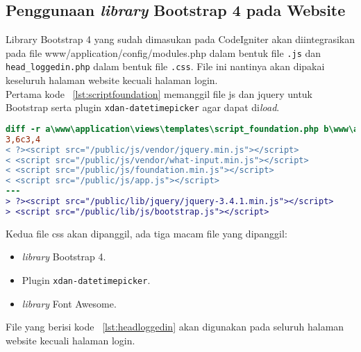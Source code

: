\subsection{Penggunaan \textit{library} Bootstrap 4 pada Website}

Library Bootstrap 4 yang sudah dimasukan pada CodeIgniter akan diintegrasikan pada file www/application/config/modules.php dalam bentuk file \texttt{.js} dan \texttt{head\_loggedin.php} dalam bentuk file \texttt{.css}. File ini nantinya akan dipakai keseluruh halaman website kecuali halaman login.\\

Pertama kode ~\ref{lst:scriptfoundation} memanggil file js dan jquery untuk Bootstrap serta plugin \texttt{xdan-datetimepicker} agar dapat di\textit{load}. \\

\begin{lstlisting}[language=diff, caption=Penambahan \path{\views\templates\script_foundation.php},  basicstyle=\ttfamily, frame=single,
columns=fullflexible, keepspaces=true, breaklines=true, label={lst:scriptfoundation}]
diff -r a\www\application\views\templates\script_foundation.php b\www\application\views\templates\script_foundation.php
3,6c3,4
< ?><script src="/public/js/vendor/jquery.min.js"></script>
< <script src="/public/js/vendor/what-input.min.js"></script>
< <script src="/public/js/foundation.min.js"></script>
< <script src="/public/js/app.js"></script>
---
> ?><script src="/public/lib/jquery/jquery-3.4.1.min.js"></script>
> <script src="/public/lib/js/bootstrap.js"></script>

\end{lstlisting}

Kedua file css akan dipanggil, ada tiga macam file yang dipanggil: 
\begin{itemize}
	\item \textit{library} Bootstrap 4.
	\item Plugin \texttt{xdan-datetimepicker}.
	\item \textit{library} Font Awesome.
\end{itemize}
File yang berisi kode ~\ref{lst:headloggedin} akan digunakan pada seluruh halaman website kecuali halaman login.

